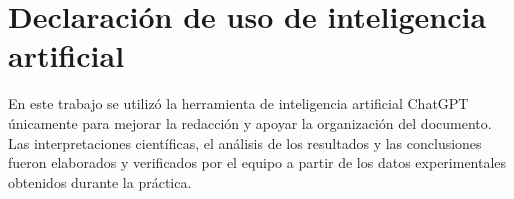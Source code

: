 \section*{Declaración de uso de inteligencia artificial}
En este trabajo se utilizó la herramienta de inteligencia artificial ChatGPT únicamente para mejorar la redacción y apoyar la organización del documento. Las interpretaciones científicas, el análisis de los resultados y las conclusiones fueron elaborados y verificados por el equipo a partir de los datos experimentales obtenidos durante la práctica.
